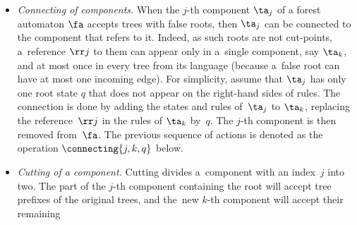 {\begin{itemize}
\item \emph{Connecting of components.}
When the $j$-th component $\ta_j$ of a forest automaton $\fa$ accepts trees with false roots, 
then $\ta_j$ can be connected to the component that refers to it. 
%
Indeed, as such roots are not cut-points, 
a~reference $\rr j$ to them can appear only in a~single component, say $\ta_k$, 
and at most once in every tree from its language (because a~false root
can have at most one incoming edge). 
%
For simplicity, assume that $\ta_j$ has only one root state $q$ that does
not appear on the right-hand sides of rules. 
%
The connection is done by adding the states and rules of~$\ta_j$ to $\ta_k$, replacing the reference~$\rr j$ in the rules of $\ta_k$ by~$q$.
%
The $j$-th component is then removed from~$\fa$.
%
The previous sequence of actions is denoted as the operation $\connecting{j,k,q}$ below. 
%
%
\item \emph{Cutting of a component.}
Cutting divides a~component  with an index~$j$ into two. 
The part of the $j$-th component containing the root will accept tree prefixes
of the original trees, and the~new $k$-th component will accept their remaining

\end{itemize}}
